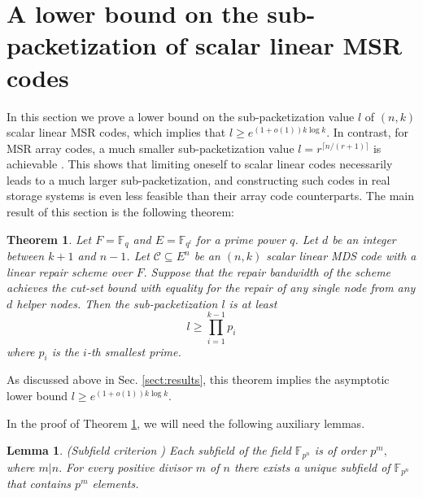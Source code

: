 \documentclass[11pt,onecolumn]{IEEEtran}
\newtheorem{theorem}{Theorem}
\newtheorem{lemma}{Lemma}
\newcommand{\ff}{{\mathbb F}}
\newcommand{\cC}{\mathcal{C}}
\begin{document}
\section{A lower bound on the sub-packetization of scalar linear MSR codes}\label{Sect:lb}
In this section we prove a lower bound on the sub-packetization value $l$ of $(n,k)$ scalar linear MSR codes, which implies that 
$l\ge e^{(1+o(1))k \log k}$. In contrast, for MSR array codes, a much smaller sub-packetization value $l=r^{\lceil n/(r+1) \rceil}$ is achievable \cite{Wang16}. This shows that limiting oneself to scalar linear  codes necessarily leads to a much larger
sub-packetization, and constructing such codes in real storage systems is even less feasible than their array code counterparts. 
The main result of this section is the following theorem:
\begin{theorem}\label{thm2} Let $F=\mathbb{F}_{q}$ and $E=\mathbb{F}_{q^l}$ for a prime power $q$.
{Let $d$ be an integer between $k+1$ and $n-1$.}
Let ${\cC} \subseteq E^n$ be an $(n,k)$ scalar linear MDS code with a linear repair scheme over $F.$ Suppose that the repair bandwidth of the scheme
achieves the cut-set bound with equality for the repair of any single node from any $d$ helper nodes. Then the sub-packetization $l$ is at least  
    $$ l \geq \prod_{i=1}^{k-1}p_i
    $$ 
    where $p_i$ is the $i$-th smallest prime.  
\end{theorem} 

As discussed above in Sec. \ref{sect:results}, this theorem implies the asymptotic lower bound  $l\ge e^{(1+o(1))k \log k}.$

\vspace*{.1in} In the proof of Theorem \ref{thm2}, we will need the following auxiliary lemmas.
\begin{lemma}\label{lem:subfield} {\rm (Subfield criterion \cite[Theorem 2.6]{Lidl94})} Each subfield  of the field $\ff_{p^n}$ is of order $p^m,$ where $m|n.$
For every positive divisor $m$ of $n$ there exists a unique subfield of $\ff_{p^n}$ that contains $p^m$ elements.
\end{lemma}
\end{document}

